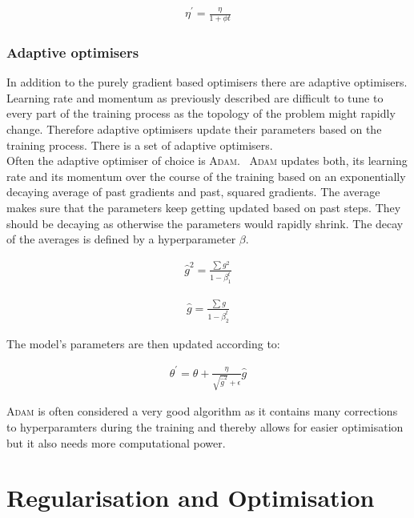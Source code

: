 \begin{align}
    \eta^{\prime} = \frac{\eta}{1 + \phi t}
\end{align}

\subsubsection{Adaptive optimisers}

In addition to the purely gradient based optimisers there are adaptive optimisers. Learning rate and momentum as previously described are difficult to tune to every part of the training process as the topology of the problem might rapidly change. Therefore adaptive optimisers update their parameters based on the training process. There is a set of adaptive optimisers.~\cite{chollet2015keras}\\
Often the adaptive optimiser of choice is \textsc{Adam}.~\cite{2014arXiv1412.6980K} \textsc{Adam} updates both, its learning rate and its momentum over the course of the training based on an exponentially decaying average of past gradients and past, squared gradients. The average makes sure that the parameters keep getting updated based on past steps. They should be decaying as otherwise the parameters would rapidly shrink. The decay of the averages is defined by a hyperparameter $\beta$.

\begin{align}
    \hat{g}^2 = \frac{\sum g^2}{1 - \beta_1^t}
\end{align}

\begin{align}
    \hat{g} = \frac{\sum g}{1 - \beta_2^t}
\end{align}

The model's parameters are then updated according to:

\begin{align}
    \theta^{\prime} = \theta + \frac{\eta}{\sqrt{\hat{g}^2} + \epsilon} \hat{g}
\end{align}

\textsc{Adam} is often considered a very good algorithm as it contains many corrections to hyperparamters during the training and thereby allows for easier optimisation but it also needs more computational power.


\section{Regularisation and Optimisation}

